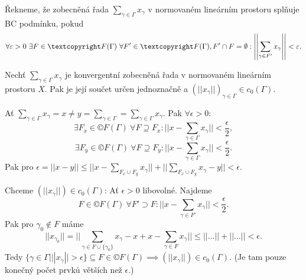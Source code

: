 \documentclass[12pt]{article}					%
\begin{document}
\begin{definice}
	Řekneme, že zobecněná řada $\sum_{\gamma \in \Gamma} x_\gamma$ v normovaném lineárním prostoru splňuje BC podmínku, pokud
	$$ \forall \epsilon > 0\ \exists F \in ©F(\Gamma)\ \forall F' \in ©F(\Gamma), F' \cap F = \O: \left|\left| \sum_{\gamma \in F'} x_\gamma \right|\right| < \epsilon. $$
\end{definice}

\begin{veta}
	Nechť $\sum_{\gamma \in \Gamma} x_\gamma$ je konvergentní zobecněná řada v normovaném lineárním prostoru $X$. Pak je její součet určen jednoznačně a $(||x_\gamma||)_{\gamma \in \Gamma} \in c_0(\Gamma)$.

	\begin{dukazin}[Jednoznačnost]
		Ať $\sum_{\gamma \in \Gamma} x_\gamma = x ≠ y = \sum_{\gamma \in \Gamma} = \sum_{\gamma \in \Gamma}x_\gamma$. Pak $\forall \epsilon > 0$:
		$$ \exists F_x \in ©F(\Gamma)\ \forall F \supseteq F_x: ||x - \sum_{\gamma \in \Gamma} x_\gamma|| < \frac{\epsilon}{2}, $$
		$$ \exists F_y \in ©F(\Gamma)\ \forall F \supseteq F_y: ||x - \sum_{\gamma \in \Gamma} x_\gamma|| < \frac{\epsilon}{2}. $$
		Pak pro $\epsilon = ||x - y|| ≤ ||x - \sum_{F_x \cup F_y} x_\gamma || + ||\sum_{F_x \cup F_y} x_\gamma - y|| < \epsilon$. \lightning
	\end{dukazin}

	\begin{dukazin}[Limita]
		Chceme $(||x_\gamma||) \in c_0(\Gamma)$: Ať $\epsilon > 0$ libovolné. Najdeme 
		$$ F \in ©F(\Gamma)\ \forall F' \supset F: ||x - \sum_{\gamma \in F'}x_\gamma || < \frac{\epsilon}{2}. $$
		Pak pro $\gamma_0 \notin F$ máme
		$$ ||x_{\gamma_0}|| = ||\sum_{\gamma \in F \cup \{\gamma_0\}} x_\gamma - x + x - \sum_{\gamma \in F}x_\gamma|| ≤ ||…|| + ||…|| < \epsilon. $$
		Tedy $\{\gamma \in \Gamma | ||x_\gamma|| > \epsilon\} \subseteq F \in ©F(\Gamma) \implies (||x_\gamma||) \in c_0(\Gamma)$. (Je tam pouze konečný počet prvků větších než $\epsilon$.)
	\end{dukazin}
\end{veta}
\end{document}

